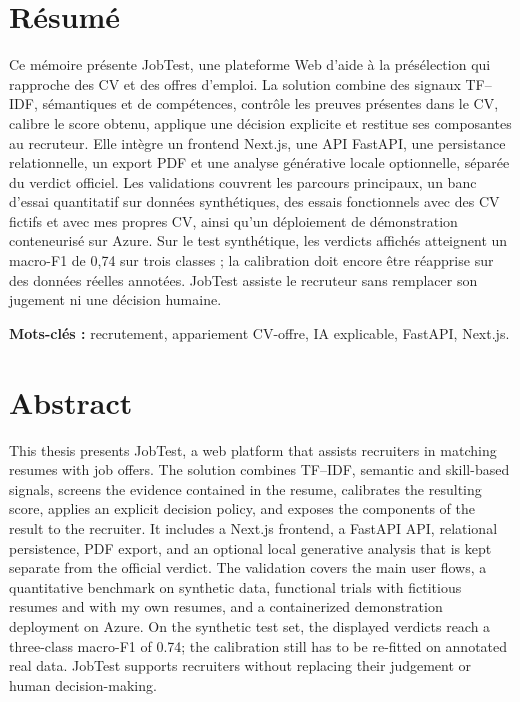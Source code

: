 \chapter*{Résumé}

Ce mémoire présente JobTest, une plateforme Web d'aide à la présélection qui rapproche des CV et des offres d'emploi. La solution combine des signaux TF--IDF, sémantiques et de compétences, contrôle les preuves présentes dans le CV, calibre le score obtenu, applique une décision explicite et restitue ses composantes au recruteur. Elle intègre un frontend Next.js, une API FastAPI, une persistance relationnelle, un export PDF et une analyse générative locale optionnelle, séparée du verdict officiel. Les validations couvrent les parcours principaux, un banc d'essai quantitatif sur données synthétiques, des essais fonctionnels avec des CV fictifs et avec mes propres CV, ainsi qu'un déploiement de démonstration conteneurisé sur Azure. Sur le test synthétique, les verdicts affichés atteignent un macro-F1 de 0,74 sur trois classes ; la calibration doit encore être réapprise sur des données réelles annotées. JobTest assiste le recruteur sans remplacer son jugement ni une décision humaine.

\noindent\textbf{Mots-clés :} recrutement, appariement CV-offre, IA explicable, FastAPI, Next.js.

\chapter*{Abstract}

This thesis presents JobTest, a web platform that assists recruiters in matching resumes with job offers. The solution combines TF--IDF, semantic and skill-based signals, screens the evidence contained in the resume, calibrates the resulting score, applies an explicit decision policy, and exposes the components of the result to the recruiter. It includes a Next.js frontend, a FastAPI API, relational persistence, PDF export, and an optional local generative analysis that is kept separate from the official verdict. The validation covers the main user flows, a quantitative benchmark on synthetic data, functional trials with fictitious resumes and with my own resumes, and a containerized demonstration deployment on Azure. On the synthetic test set, the displayed verdicts reach a three-class macro-F1 of 0.74; the calibration still has to be re-fitted on annotated real data. JobTest supports recruiters without replacing their judgement or human decision-making.

